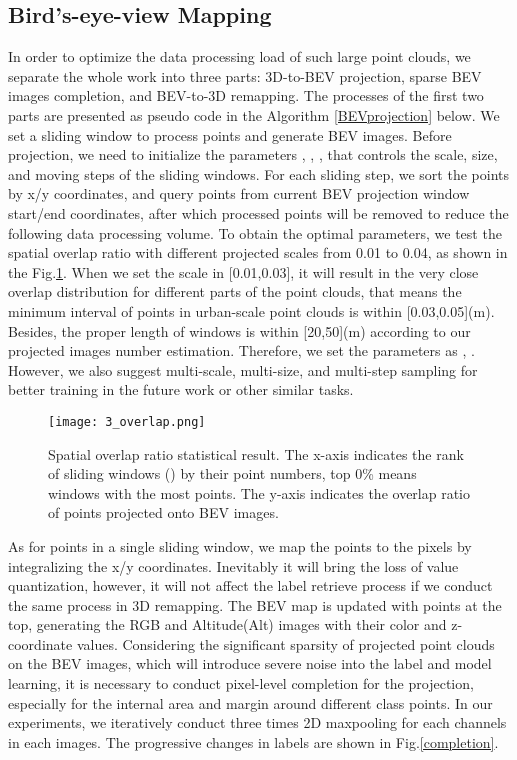\documentclass[conference]{IEEEtran}
\begin{document}
\subsection{Bird's-eye-view Mapping}
In order to optimize the data processing load of such large point clouds, we separate the whole work into three parts: 3D-to-BEV projection, sparse BEV images completion, and BEV-to-3D remapping. The processes of the first two parts are presented as pseudo code in the Algorithm \ref{BEVprojection} below. We set a sliding window to process points and generate BEV images. Before projection, we need to initialize the parameters , , , that controls the scale, size, and moving steps of the sliding windows. For each sliding step, we sort the points by x/y coordinates, and query points from current BEV projection window start/end coordinates, after which processed points will be removed to reduce the following data processing volume. To obtain the optimal parameters, we test the spatial overlap ratio with different projected scales from 0.01 to 0.04, as shown in the Fig.\ref{overlap}. When we set the scale in [0.01,0.03], it will result in the very close overlap distribution for different parts of the point clouds, that means the minimum interval of points in urban-scale point clouds is within [0.03,0.05](m). Besides, the proper length of windows is within [20,50](m) according to our projected images number estimation. Therefore, we set the parameters as , . However, we also suggest multi-scale, multi-size, and multi-step sampling for better training in the future work or other similar tasks.

\begin{figure}[t!]
\centering
\texttt{[image: 3\_overlap.png]}
\caption{Spatial overlap ratio statistical result. The x-axis indicates the rank of sliding windows () by their point numbers, top 0\% means windows with the most points. The y-axis indicates the overlap ratio of points projected onto BEV images.}
\label{overlap}
\end{figure}

As for points in a single sliding window, we map the points to the pixels by integralizing the x/y coordinates. Inevitably it will bring the loss of value quantization, however, it will not affect the label retrieve process if we conduct the same process in 3D remapping. The BEV map is updated with points at the top, generating the RGB and Altitude(Alt) images with their color and z-coordinate values. Considering the significant sparsity of projected point clouds on the BEV images, which will introduce severe noise into the label and model learning, it is necessary to conduct pixel-level completion for the projection, especially for the internal area and margin around different class points. In our experiments, we iteratively conduct three times 2D maxpooling for each channels in each images. The progressive changes in labels are shown in Fig.\ref{completion}.
\end{document}
